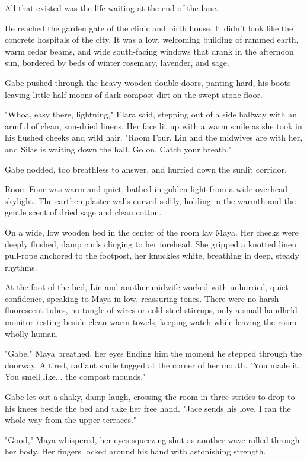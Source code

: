 All that existed was the life waiting at the end of the lane. 

He reached the garden gate of the clinic and birth house. It didn't look like the concrete hospitals of the city. It was a low, welcoming building of rammed earth, warm cedar beams, and wide south-facing windows that drank in the afternoon sun, bordered by beds of winter rosemary, lavender, and sage.

Gabe pushed through the heavy wooden double doors, panting hard, his boots leaving little half-moons of dark compost dirt on the swept stone floor. 

"Whoa, easy there, lightning," Elara said, stepping out of a side hallway with an armful of clean, sun-dried linens. Her face lit up with a warm smile as she took in his flushed cheeks and wild hair. "Room Four. Lin and the midwives are with her, and Silas is waiting down the hall. Go on. Catch your breath."

Gabe nodded, too breathless to answer, and hurried down the sunlit corridor. 

Room Four was warm and quiet, bathed in golden light from a wide overhead skylight. The earthen plaster walls curved softly, holding in the warmth and the gentle scent of dried sage and clean cotton. 

On a wide, low wooden bed in the center of the room lay Maya. Her cheeks were deeply flushed, damp curls clinging to her forehead. She gripped a knotted linen pull-rope anchored to the footpost, her knuckles white, breathing in deep, steady rhythms. 

At the foot of the bed, Lin and another midwife worked with unhurried, quiet confidence, speaking to Maya in low, reassuring tones. There were no harsh fluorescent tubes, no tangle of wires or cold steel stirrups, only a small handheld monitor resting beside clean warm towels, keeping watch while leaving the room wholly human.

"Gabe," Maya breathed, her eyes finding him the moment he stepped through the doorway. A tired, radiant smile tugged at the corner of her mouth. "You made it. You smell like... the compost mounds."

Gabe let out a shaky, damp laugh, crossing the room in three strides to drop to his knees beside the bed and take her free hand. "Jace sends his love. I ran the whole way from the upper terraces."

"Good," Maya whispered, her eyes squeezing shut as another wave rolled through her body. Her fingers locked around his hand with astonishing strength. 

